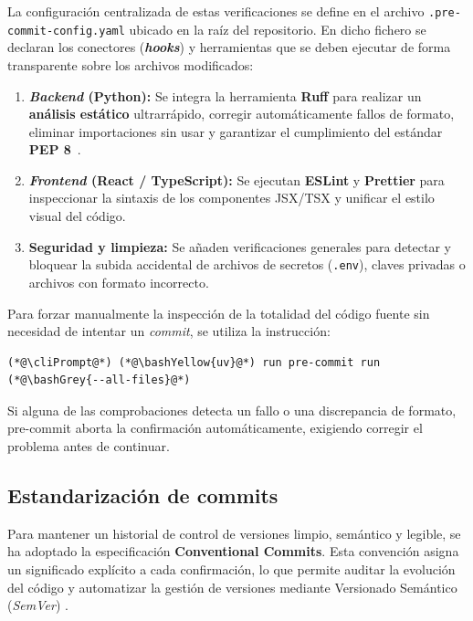 La configuración centralizada de estas verificaciones se define en el archivo \texttt{.pre-commit-config.yaml} ubicado en la raíz del repositorio. En dicho fichero se declaran los conectores (\textbf{\textit{hooks}}) y herramientas que se deben ejecutar de forma transparente sobre los archivos modificados:

\begin{enumerate}
    \item \textbf{\textit{Backend} (Python):} Se integra la herramienta \textbf{Ruff} para realizar un \textbf{análisis estático} ultrarrápido, corregir automáticamente fallos de formato, eliminar importaciones sin usar y garantizar el cumplimiento del estándar \textbf{PEP 8}~\cite{pep8}.
    \item \textbf{\textit{Frontend} (React / TypeScript):} Se ejecutan \textbf{ESLint} y \textbf{Prettier} para inspeccionar la sintaxis de los componentes JSX/TSX y unificar el estilo visual del código.
    \item \textbf{Seguridad y limpieza:} Se añaden verificaciones generales para detectar y bloquear la subida accidental de archivos de secretos (\texttt{.env}), claves privadas o archivos con formato incorrecto.
\end{enumerate}

Para forzar manualmente la inspección de la totalidad del código fuente sin necesidad de intentar un \textit{commit}, se utiliza la instrucción:

\begin{lstlisting}
(*@\cliPrompt@*) (*@\bashYellow{uv}@*) run pre-commit run (*@\bashGrey{--all-files}@*)
\end{lstlisting}

Si alguna de las comprobaciones detecta un fallo o una discrepancia de formato, pre-commit aborta la confirmación automáticamente, exigiendo corregir el problema antes de continuar.

\subsection{Estandarización de commits}\label{subsec:estandarizacion_commits}

Para mantener un historial de control de versiones limpio, semántico y legible, se ha adoptado la especificación \textbf{Conventional Commits}. Esta convención asigna un significado explícito a cada confirmación, lo que permite auditar la evolución del código y automatizar la gestión de versiones mediante Versionado Semántico (\textit{SemVer}) \cite{semver}.

